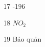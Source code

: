 \begin{loigiaibt}{17}
 -196
\end{loigiaibt}
\begin{loigiaibt}{18}
 $NO_2$
\end{loigiaibt}
\begin{loigiaibt}{19}
 Bảo quản
\end{loigiaibt}
